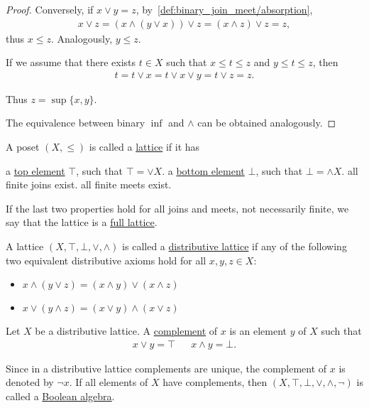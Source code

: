 \begin{proof}
  Conversely, if $x \lor y = z$, by~\ref{def:binary_join_meet/absorption},
  \begin{align*}
    x \lor z = (x \land (y \lor x)) \lor z = (x \land z) \lor z = z,
  \end{align*}
  thus $x \leq z$. Analogously, $y \leq z$.

  If we assume that there exists $t \in X$ such that $x \leq t \leq z$ and $y \leq t \leq z$, then
  \begin{align*}
    t = t \lor x = t \lor x \lor y = t \lor z = z.
  \end{align*}

  Thus $z = \sup \{ x, y \}$.

  The equivalence between binary $\inf$ and $\land$ can be obtained analogously.
\end{proof}

\begin{definition}\label{def:lattice}\cite[28]{Lectures:general_topology}
  A poset $(X, \leq)$ is called a \uline{lattice} if it has
  \begin{description}
     a \uline{top element} $\top$, such that $\top = \lor X$.
     a \uline{bottom element} $\bot$, such that $\bot = \land X$.
     all finite joins exist.
     all finite meets exist.
  \end{description}

  If the last two properties hold for all joins and meets, not necessarily finite, we say that the lattice is a \uline{full lattice}.
\end{definition}

\begin{definition}\label{def:distributive_lattice}\cite{nLab:distributive_lattice}
  A lattice $(X, \top, \bot, \lor, \land)$ is called a \uline{distributive lattice} if any of the following two equivalent distributive axioms hold for all $x, y, z \in X$:
  \begin{itemize}
    \item $x \land (y \lor z) = (x \land y) \lor (x \land z)$
    \item $x \lor (y \land z) = (x \lor y) \land (x \lor z)$
  \end{itemize}
\end{definition}

\begin{definition}\label{def:boolean_algebra}\cite{nLab:boolean_algebra}
  Let $X$ be a distributive lattice. A \uline{complement} of $x$ is an element $y$ of $X$ such that
  \begin{align*}
    x \lor y = \top && x \land y = \bot.
  \end{align*}

  Since in a distributive lattice complements are unique, the complement of $x$ is denoted by $\neg x$. If all elements of $X$ have complements, then $(X, \top, \bot, \lor, \land, \neg)$ is called a \uline{Boolean algebra}.
\end{definition}

